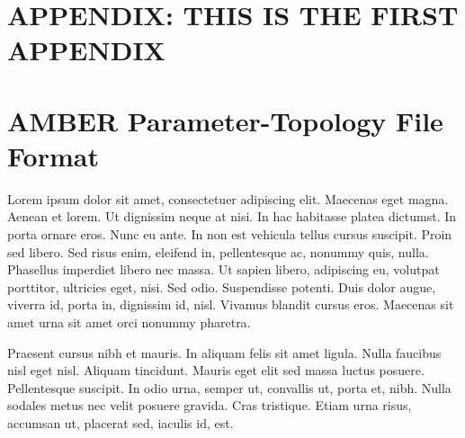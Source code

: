 %

{\chapter*{APPENDIX: THIS IS THE FIRST APPENDIX}
\setcounter{chapter}{1}}
{\chapter{AMBER Parameter-Topology File Format}}



Lorem ipsum dolor sit amet, consectetuer adipiscing elit. Maecenas
eget magna. Aenean et lorem. Ut dignissim neque at nisi. In hac
habitasse platea dictumst. In porta ornare eros. Nunc eu ante. In
non est vehicula tellus cursus suscipit. Proin sed libero. Sed risus
enim, eleifend in, pellentesque ac, nonummy quis, nulla. Phasellus
imperdiet libero nec massa. Ut sapien libero, adipiscing eu,
volutpat porttitor, ultricies eget, nisi. Sed odio. Suspendisse
potenti. Duis dolor augue, viverra id, porta in, dignissim id, nisl.
Vivamus blandit cursus eros. Maecenas sit amet urna sit amet orci
nonummy pharetra.

Praesent cursus nibh et mauris. In aliquam felis sit amet ligula.
Nulla faucibus nisl eget nisl. Aliquam tincidunt. Mauris eget elit
sed massa luctus posuere. Pellentesque suscipit. In odio urna,
semper ut, convallis ut, porta et, nibh. Nulla sodales metus nec
velit posuere gravida. Cras tristique. Etiam urna risus, accumsan
ut, placerat sed, iaculis id, est.

